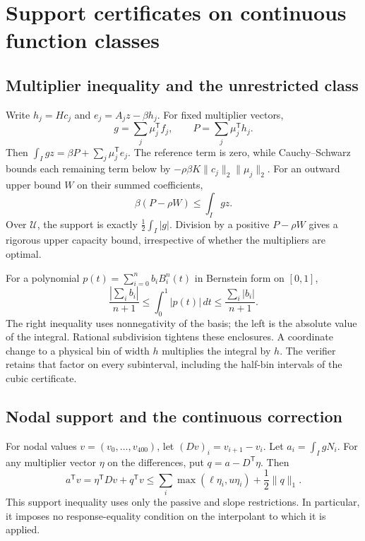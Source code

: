 \documentclass[9pt]{osa-supplemental-document}
\begin{document}
\section{Support certificates on continuous function classes}
\subsection{Multiplier inequality and the unrestricted class}
Write $h_j=Hc_j$ and $e_j=A_jz-\beta h_j$. For fixed multiplier vectors,
\begin{equation}
 g=\sum_j\mu_j^{\mathsf T}f_j,\qquad P=\sum_j\mu_j^{\mathsf T}h_j.
\end{equation}
Then $\int_Igz=\beta P+\sum_j\mu_j^{\mathsf T}e_j$. The reference term is zero, while Cauchy--Schwarz bounds each remaining term below by $-\rho\beta K\|c_j\|_2\|\mu_j\|_2$. For an outward upper bound $W$ on their summed coefficients,
\begin{equation}
 \beta(P-\rho W)\leq\int_Igz.
 \label{eq:dualsupport}
\end{equation}
Over $\mathcal U$, the support is exactly $\tfrac12\int_I|g|$. Division by a positive $P-\rho W$ gives a rigorous upper capacity bound, irrespective of whether the multipliers are optimal.

For a polynomial $p(t)=\sum_{i=0}^n b_iB_i^n(t)$ in Bernstein form on $[0,1]$,
\begin{equation}
 \frac{|\sum_i b_i|}{n+1}\leq\int_0^1|p(t)|\,dt
 \leq\frac{\sum_i|b_i|}{n+1}.
 \label{eq:bernstein}
\end{equation}
The right inequality uses nonnegativity of the basis; the left is the absolute value of the integral. Rational subdivision tightens these enclosures. A coordinate change to a physical bin of width $h$ multiplies the integral by $h$. The verifier retains that factor on every subinterval, including the half-bin intervals of the cubic certificate.

\subsection{Nodal support and the continuous correction}
For nodal values $v=(v_0,\ldots,v_{400})$, let $(Dv)_i=v_{i+1}-v_i$. Let $a_i=\int_IgN_i$. For any multiplier vector $\eta$ on the differences, put $q=a-D^{\mathsf T}\eta$. Then
\begin{equation}
 a^{\mathsf T}v=\eta^{\mathsf T}Dv+q^{\mathsf T}v
 \leq\sum_i\max(\ell\eta_i,u\eta_i)+\frac12\|q\|_1.
 \label{eq:nodalsupport}
\end{equation}
This support inequality uses only the passive and slope restrictions. In particular, it imposes no response-equality condition on the interpolant to which it is applied.
\end{document}
